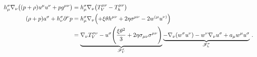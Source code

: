 \documentclass[main.tex]{subfiles}
\begin{document}
\begin{subequations}
\begin{align}
  h^\sigma_\mu \nabla_\nu \qty((p+\rho) u^\mu u^\nu + p g^{\mu\nu}) &=
  h^\sigma_\mu \nabla_\nu \qty(T^{\mu\nu}_V - T^{\mu\nu}_h)  \\
  (\rho + p) a^\sigma + h^\sigma_\nu \partial^\nu p &= h^\sigma_\mu \nabla_\nu \qty(
  +\xi \theta h^{\mu\nu} + 2 \eta \sigma^{\mu\nu} - 2w^{(\mu} u^{\nu)})  \\
  &= \underbrace{\nabla_\nu T^{\sigma\nu}_V - u^\sigma \qty(\frac{\xi \theta^2}{3} +2 \eta \sigma_{\mu\nu} \sigma^{\mu\nu})}_{\substack{\mathscr F ^\sigma _V}}
  \underbrace{ - \nabla_\nu (w^\sigma u^\nu) - w^\nu \nabla_\nu u^\sigma + a_\mu w^\mu u^\sigma  }_{\substack{\mathscr F ^\sigma _h}} \,.
  \label{eq:full-spatial-equations-of-motion}
\end{align}
\end{subequations}

%
%
\end{document}
